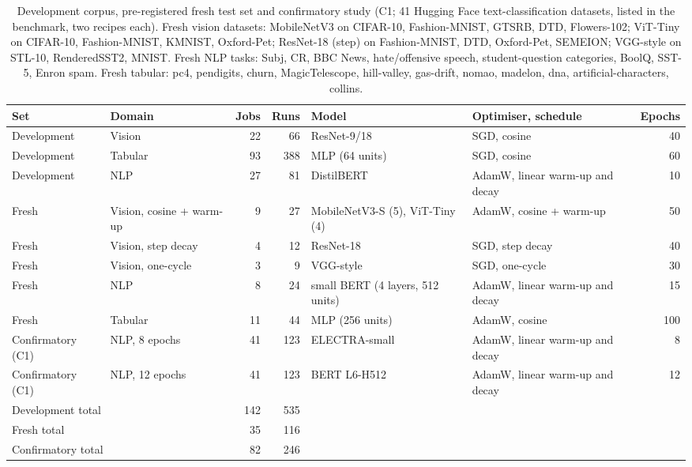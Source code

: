 \documentclass[3p,twocolumn,10pt]{elsarticle}
\theoremstyle{definition}
\begin{document}
\begin{table}[t]
\centering
\caption{Development corpus, pre-registered fresh test set and confirmatory study (C1; 41 Hugging Face text-classification datasets, listed in the benchmark, two recipes each). Fresh vision datasets: MobileNetV3 on CIFAR-10, Fashion-MNIST, GTSRB, DTD, Flowers-102; ViT-Tiny on CIFAR-10, Fashion-MNIST, KMNIST, Oxford-Pet; ResNet-18 (step) on Fashion-MNIST, DTD, Oxford-Pet, SEMEION; VGG-style on STL-10, RenderedSST2, MNIST. Fresh NLP tasks: Subj, CR, BBC News, hate/offensive speech, student-question categories, BoolQ, SST-5, Enron spam. Fresh tabular: pc4, pendigits, churn, MagicTelescope, hill-valley, gas-drift, nomao, madelon, dna, artificial-characters, collins.}
\label{tab:corpus}
\footnotesize
\begin{adjustbox}{max width=\textwidth}
\begin{tabular}{llrrp{3.4cm}p{3.2cm}r}
\toprule
Set & Domain & Jobs & Runs & Model & Optimiser, schedule & Epochs \\
\midrule
Development & Vision & 22 & 66 & ResNet-9/18 & SGD, cosine & 40 \\
Development & Tabular & 93 & 388 & MLP (64 units) & SGD, cosine & 60 \\
Development & NLP & 27 & 81 & DistilBERT & AdamW, linear warm-up and decay & 10 \\
\midrule
Fresh & Vision, cosine + warm-up & 9 & 27 & MobileNetV3-S (5), ViT-Tiny (4) & AdamW, cosine + warm-up & 50 \\
Fresh & Vision, step decay & 4 & 12 & ResNet-18 & SGD, step decay & 40 \\
Fresh & Vision, one-cycle & 3 & 9 & VGG-style & SGD, one-cycle & 30 \\
Fresh & NLP & 8 & 24 & small BERT (4 layers, 512 units) & AdamW, linear warm-up and decay & 15 \\
Fresh & Tabular & 11 & 44 & MLP (256 units) & AdamW, cosine & 100 \\
\midrule
Confirmatory (C1) & NLP, 8 epochs & 41 & 123 & ELECTRA-small & AdamW, linear warm-up and decay & 8 \\
Confirmatory (C1) & NLP, 12 epochs & 41 & 123 & BERT L6-H512 & AdamW, linear warm-up and decay & 12 \\
\midrule
\multicolumn{2}{l}{Development total} & 142 & 535 & & & \\
\multicolumn{2}{l}{Fresh total} & 35 & 116 & & & \\
\multicolumn{2}{l}{Confirmatory total} & 82 & 246 & & & \\
\bottomrule
\end{tabular}
\end{adjustbox}
\end{table}
\end{document}
